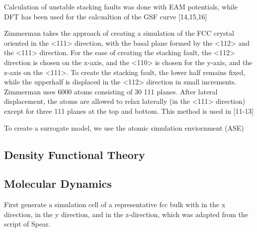 Calculation of unstable stacking faults\cite{sun1990_eam_esf,sun1993_eam_esf,farkas1997_eam_usf} was done with EAM potentials, while DFT has been used for the calcualtion of the GSF curve [14,15,16]

Zimmerman takes the approach of creating a simulation of the FCC crystal oriented in the <111> direction, with the basal plane formed by the <112> and the <111> direction.  For the ease of creating the stacking fault, the <112> direction is chosen on the x-axis, and the <110> is chosen for the y-axis, and the z-axis on the <111>.  To create the stacking fault, the lower half remains fixed, while the upperhalf is displaced in the <112> direction in small increments.  Zimmerman uses 6000 atoms consisting of 30 {111} planes.  After lateral displacement, the atoms are allowed to relax laterally (in the <111> direction) except for three {111} planes at the top and bottom.  This method is used in [11-13]

To create a surrogate model, we use the atomic simulation enviornment (ASE)

\subsection{Density Functional Theory}



\subsection{Molecular Dynamics}

First generate a simulation cell of a representative fcc bulk with \hkl[1 1 2] in the x direction, \hkl[-1 1 0] in the y direction, and \hkl[-1 -1 1] in the z-direction, which was adapted from the script of Spear\cite{spear2012_lammps_gsf}.
